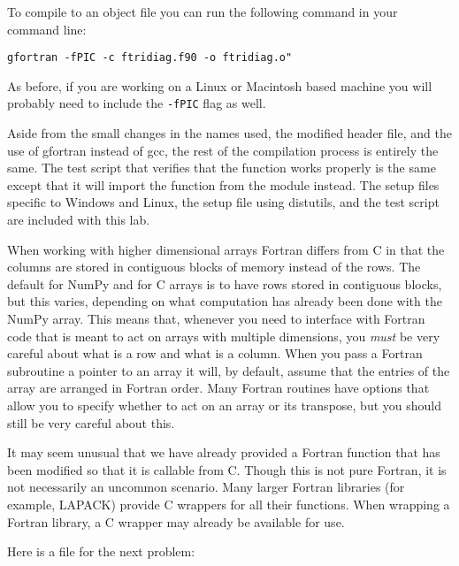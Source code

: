 To compile  to an object file you can run the following command in your command line:
\begin{lstlisting}[style=ShellInput]
gfortran -fPIC -c ftridiag.f90 -o ftridiag.o"
\end{lstlisting}
As before, if you are working on a Linux or Macintosh based machine you will probably need to include the \texttt{-fPIC} flag as well.

Aside from the small changes in the names used, the modified header file, and the use of gfortran instead of gcc, the rest of the compilation process is entirely the same.
The test script that verifies that the function works properly is the same except that it will import the function from the module  instead.
The setup files specific to Windows and Linux, the setup file using distutils, and the test script are included with this lab.

\begin{warn}
When working with higher dimensional arrays Fortran differs from C in that the columns are stored in contiguous blocks of memory instead of the rows.
The default for NumPy and for C arrays is to have rows stored in contiguous blocks, but this varies, depending on what computation has already been done with the NumPy array.
This means that, whenever you need to interface with Fortran code that is meant to act on arrays with multiple dimensions, you \emph{must} be very careful about what is a row and what is a column.
When you pass a Fortran subroutine a pointer to an array it will, by default, assume that the entries of the array are arranged in Fortran order.
Many Fortran routines have options that allow you to specify whether to act on an array or its transpose, but you should still be very careful about this.
\end{warn}

\begin{info}
It may seem unusual that we have already provided a Fortran function that has been modified so that it is callable from C.
Though this is not pure Fortran, it is not necessarily an uncommon scenario.
Many larger Fortran libraries (for example, LAPACK) provide C wrappers for all their functions.
When wrapping a Fortran library, a C wrapper may already be available for use.
\end{info}

Here is a file for the next problem:


